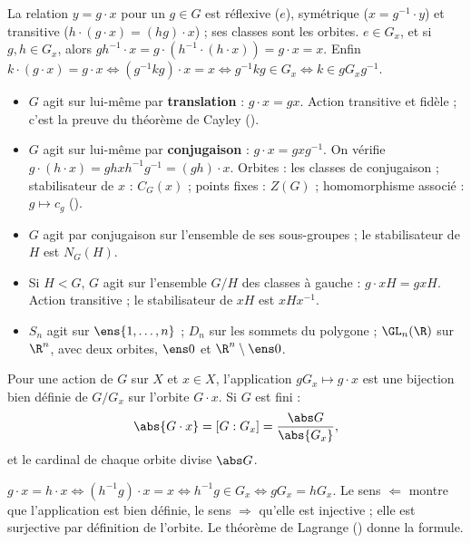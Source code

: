 \begin{preuve}
La relation \og $y=g\cdot x$ pour un $g\in G$ \fg{} est réflexive ($e$), symétrique ($x=g^{-1}\cdot y$) et transitive ($h\cdot(g\cdot x)=(hg)\cdot x$) ; ses classes sont les orbites. $e\in G_x$, et si $g,h\in G_x$, alors $gh^{-1}\cdot x=g\cdot(h^{-1}\cdot(h\cdot x))=g\cdot x=x$. Enfin $k\cdot(g\cdot x)=g\cdot x\iff(g^{-1}kg)\cdot x=x\iff g^{-1}kg\in G_x\iff k\in gG_xg^{-1}$.
\end{preuve}
\begin{exemple}\label{ex-actions}
\begin{itemize}
\item $G$ agit sur lui-même par \textbf{translation} : $g\cdot x=gx$. Action transitive et fidèle ; c'est la preuve du théorème de Cayley ().
\item $G$ agit sur lui-même par \textbf{conjugaison} : $g\cdot x=gxg^{-1}$. On vérifie $g\cdot(h\cdot x)=ghxh^{-1}g^{-1}=(gh)\cdot x$. Orbites : les classes de conjugaison ; stabilisateur de $x$ : $C_G(x)$ ; points fixes : $Z(G)$ ; homomorphisme associé : $g\mapsto c_g$ ().
\item $G$ agit par conjugaison sur l'ensemble de ses sous-groupes ; le stabilisateur de $H$ est $N_G(H)$.
\item Si $H<G$, $G$ agit sur l'ensemble $G/H$ des classes à gauche : $g\cdot xH=gxH$. Action transitive ; le stabilisateur de $xH$ est $xHx^{-1}$.
\item $S_n$ agit sur $\ens{1,\dots,n}$ ; $D_n$ sur les sommets du polygone ; $\GL_n(\R)$ sur $\R^n$, avec deux orbites, $\ens0$ et $\R^n\setminus\ens0$.
\end{itemize}
\end{exemple}
\begin{theoreme}\label{thm-orbite-stab}
Pour une action de $G$ sur $X$ et $x\in X$, l'application $gG_x\mapsto g\cdot x$ est une bijection bien définie de $G/G_x$ sur l'orbite $G\cdot x$. Si $G$ est fini :
\[\abs{G\cdot x}=[G:G_x]=\frac{\abs G}{\abs{G_x}},\]
et le cardinal de chaque orbite divise $\abs G$.
\end{theoreme}
\begin{preuve}
$g\cdot x=h\cdot x\iff(h^{-1}g)\cdot x=x\iff h^{-1}g\in G_x\iff gG_x=hG_x$. Le sens \og $\Leftarrow$ \fg{} montre que l'application est bien définie, le sens \og $\Rightarrow$ \fg{} qu'elle est injective ; elle est surjective par définition de l'orbite. Le théorème de Lagrange () donne la formule.
\end{preuve}
